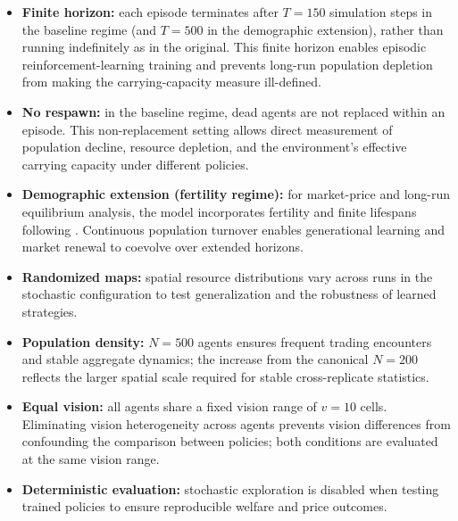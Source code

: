 \documentclass[pdflatex,sn-mathphys-num]{sn-jnl}%
\theoremstyle{thmstyleone}%
\theoremstyle{thmstyletwo}%
\theoremstyle{thmstylethree}%
\begin{document}
\begin{itemize}
    \item \textbf{Finite horizon:} each episode terminates after $T = 150$ simulation steps in the baseline regime (and $T = 500$ in the demographic extension), rather than running indefinitely as in the original. This finite horizon enables episodic reinforcement-learning training and prevents long-run population depletion from making the carrying-capacity measure ill-defined.
    
    \item \textbf{No respawn:} in the baseline regime, dead agents are not replaced within an episode. This non-replacement setting allows direct measurement of population decline, resource depletion, and the environment's effective carrying capacity under different policies.
    
    \item \textbf{Demographic extension (fertility regime):} for market-price and long-run equilibrium analysis, the model incorporates fertility and finite lifespans following \citet{EpsteinAxtell1996}. Continuous population turnover enables generational learning and market renewal to coevolve over extended horizons.
    
    \item \textbf{Randomized maps:} spatial resource distributions vary across runs in the stochastic configuration to test generalization and the robustness of learned strategies.
    
    \item \textbf{Population density:} $N = 500$ agents ensures frequent trading encounters and stable aggregate dynamics; the increase from the canonical $N = 200$ reflects the larger spatial scale required for stable cross-replicate statistics.
    
    \item \textbf{Equal vision:} all agents share a fixed vision range of $v = 10$ cells. Eliminating vision heterogeneity across agents prevents vision differences from confounding the comparison between policies; both conditions are evaluated at the same vision range.
    
    \item \textbf{Deterministic evaluation:} stochastic exploration is disabled when testing trained policies to ensure reproducible welfare and price outcomes.
\end{itemize}
\end{document}
